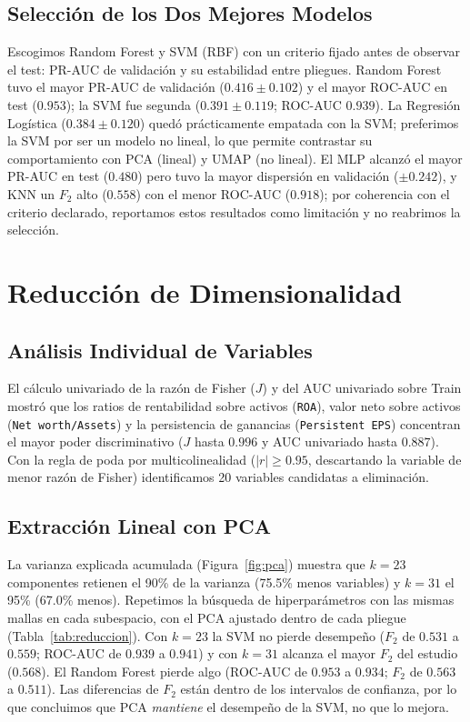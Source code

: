 \documentclass[journal]{IEEEtran}
\begin{document}
\subsection{Selección de los Dos Mejores Modelos}
Escogimos Random Forest y SVM (RBF) con un criterio fijado antes de observar el test: PR-AUC de validación y su estabilidad entre pliegues. Random Forest tuvo el mayor PR-AUC de validación ($0.416 \pm 0.102$) y el mayor ROC-AUC en test ($0.953$); la SVM fue segunda ($0.391 \pm 0.119$; ROC-AUC $0.939$). La Regresión Logística ($0.384 \pm 0.120$) quedó prácticamente empatada con la SVM; preferimos la SVM por ser un modelo no lineal, lo que permite contrastar su comportamiento con PCA (lineal) y UMAP (no lineal). El MLP alcanzó el mayor PR-AUC en test ($0.480$) pero tuvo la mayor dispersión en validación ($\pm 0.242$), y KNN un $F_2$ alto ($0.558$) con el menor ROC-AUC ($0.918$); por coherencia con el criterio declarado, reportamos estos resultados como limitación y no reabrimos la selección.

\section{Reducción de Dimensionalidad}
\subsection{Análisis Individual de Variables}
El cálculo univariado de la razón de Fisher ($J$) y del AUC univariado sobre Train mostró que los ratios de rentabilidad sobre activos (\texttt{ROA}), valor neto sobre activos (\texttt{Net worth/Assets}) y la persistencia de ganancias (\texttt{Persistent EPS}) concentran el mayor poder discriminativo ($J$ hasta $0.996$ y AUC univariado hasta $0.887$). Con la regla de poda por multicolinealidad ($|r| \ge 0.95$, descartando la variable de menor razón de Fisher) identificamos 20 variables candidatas a eliminación.

\subsection{Extracción Lineal con PCA}
La varianza explicada acumulada (Figura~\ref{fig:pca}) muestra que $k=23$ componentes retienen el 90\% de la varianza (75.5\% menos variables) y $k=31$ el 95\% (67.0\% menos). Repetimos la búsqueda de hiperparámetros con las mismas mallas en cada subespacio, con el PCA ajustado dentro de cada pliegue (Tabla~\ref{tab:reduccion}). Con $k=23$ la SVM no pierde desempeño ($F_2$ de $0.531$ a $0.559$; ROC-AUC de $0.939$ a $0.941$) y con $k=31$ alcanza el mayor $F_2$ del estudio ($0.568$). El Random Forest pierde algo (ROC-AUC de $0.953$ a $0.934$; $F_2$ de $0.563$ a $0.511$). Las diferencias de $F_2$ están dentro de los intervalos de confianza, por lo que concluimos que PCA \emph{mantiene} el desempeño de la SVM, no que lo mejora.
\end{document}
